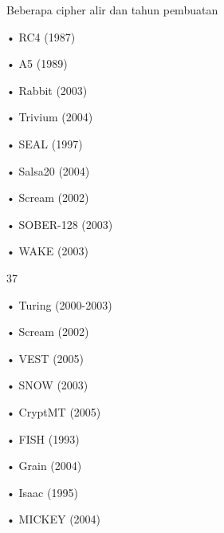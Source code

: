 \documentclass{article}
\begin{document}

Beberapa cipher alir dan tahun pembuatan

• RC4 (1987)

• A5 (1989)

• Rabbit (2003)

• Trivium (2004)

• SEAL (1997)

• Salsa20 (2004)

• Scream (2002)

• SOBER-128 (2003)

• WAKE (2003)

37

• Turing (2000-2003)

• Scream (2002)

• VEST (2005)

• SNOW (2003)

• CryptMT (2005)

• FISH (1993)

• Grain (2004)

• Isaac (1995)

• MICKEY (2004)
\end{document}
